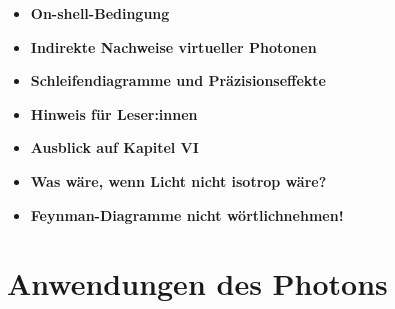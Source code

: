 \vspace{1em}
\begin{tcolorbox}[title=Hinweisboxen, hinweisbox]
	\begin{itemize}
		\item \textbf{On-shell-Bedingung} \dotfill \pageref{box:On-shell-Bedingung}
		\item \textbf{Indirekte Nachweise virtueller Photonen} \dotfill \pageref{box:Nachweis virtueller Photonen}
		\item \textbf{Schleifendiagramme und Präzisionseffekte} \dotfill \pageref{box:Schleifendiagramme}
		\item \textbf{Hinweis für Leser:innen} \dotfill \pageref{box:Hinweis füe Leser}
		\item \textbf{Ausblick auf Kapitel VI} \dotfill \pageref{box:Ausblick auf Kapitel 6}
	\end{itemize}
\end{tcolorbox}
\vspace{1em}

\begin{tcolorbox}[title=hypothetische Boxen, hypobox]
	\begin{itemize}
		\item \textbf{Was wäre, wenn Licht nicht isotrop wäre?} \dotfill \pageref{box:was wäre nicht isotop}
	\end{itemize}
\end{tcolorbox}

\vspace{1em}
\begin{tcolorbox}[title=Warnhinweise, warnbox]
	\begin{itemize}
		\item \textbf{Feynman-Diagramme nicht wörtlich\newline nehmen!} \dotfill \pageref{box:Warnung}
	\end{itemize}
\end{tcolorbox}

\section{Anwendungen des Photons}
\vspace{1em}

